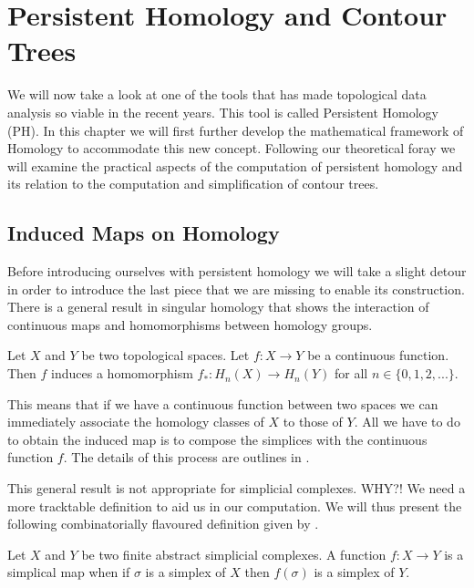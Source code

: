 \chapter{Persistent Homology and Contour Trees}
\label{chapter4}

We will now take a look at one of the tools that has made topological data analysis so viable in the recent years. This tool is called Persistent Homology (PH). In this chapter we will first further develop the mathematical framework of Homology to accommodate this new concept. Following our theoretical foray we will examine the practical aspects of the computation of persistent homology and its relation to the computation and simplification of contour trees.

\section{Induced Maps on Homology}

Before introducing ourselves with persistent homology we will take a slight detour in order to introduce the last piece that we are missing to enable its construction. There is a general result in singular homology that shows the interaction of continuous maps and homomorphisms between homology groups.

\begin{defn} Let $X$ and $Y$ be two topological spaces. Let $f: X \to Y$ be a continuous function. Then $f$ induces a homomorphism $f_*: H_n(X) \to H_n(Y)$ for all $n \in \{0, 1, 2, ...\}$. \end{defn}

This means that if we have a continuous function between two spaces we can immediately associate the homology classes of $X$ to those of $Y$. All we have to do to obtain the induced map is to compose the simplices with the continuous function $f$. The details of this process are outlines in \cite{algebraic-topology}.


This general result is not appropriate for simplicial complexes. WHY?! We need a more tracktable definition to aid us in our computation. We will thus present the following combinatorially flavoured definition given by \cite{combinatorial-algebraic-topology}. 


\begin{defn} Let $X$ and $Y$ be two finite abstract simplicial complexes. A function $f: X \to Y$ is a simplical map when if $\sigma$ is a simplex of $X$ then $f(\sigma)$ is a simplex of $Y$. \end{defn}

